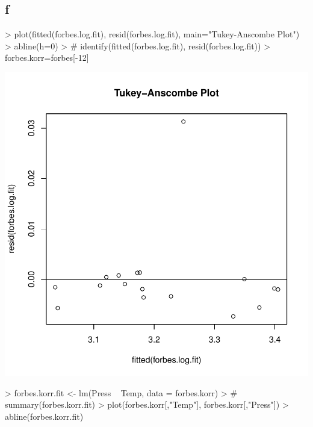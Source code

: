 \subsection{f}
\begin{Schunk}
\begin{Sinput}
> plot(fitted(forbes.log.fit), resid(forbes.log.fit), main="Tukey-Anscombe Plot")
> abline(h=0)
> # identify(fitted(forbes.log.fit), resid(forbes.log.fit))
> forbes.korr=forbes[-12]
\end{Sinput}
\end{Schunk}
\includegraphics{sw12_1-008}
\begin{Schunk}
\begin{Sinput}
> forbes.korr.fit <- lm(Press ~ Temp, data = forbes.korr)
> # summary(forbes.korr.fit)
> plot(forbes.korr[,"Temp"], forbes.korr[,"Press"])
> abline(forbes.korr.fit)
\end{Sinput}
\end{Schunk}
